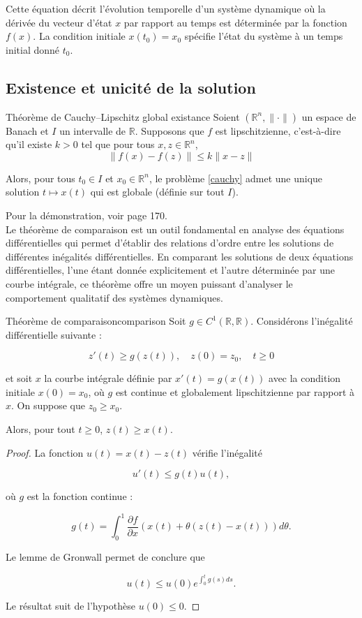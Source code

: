 \documentclass[12pt,a4paper]{report}%
\begin{document}
Cette équation décrit l'évolution temporelle d'un système dynamique où la dérivée du vecteur d'état \( x \) par rapport au temps est déterminée par la fonction \( f(x) \). La condition initiale \( x(t_0) = x_0 \) spécifie l'état du système à un temps initial donné \( t_0 \).

\subsection{Existence et unicité de la solution}
\begin{théorème}{Théorème de Cauchy–Lipschitz global }{existance}
Soient \( (\mathbb{R}^n ,\| \cdot \|) \) un espace de Banach et \( I \) un intervalle de \( \mathbb{R} \). Supposons que \( f \) est lipschitzienne, c'est-à-dire qu'il existe \( k > 0 \) tel que pour tous \( x, z \in \mathbb{R}^n \),
\[ \| f(x) - f(z) \| \leq k \| x - z \| \]

Alors, pour tous \( t_0 \in I \) et \( x_0 \in \mathbb{R}^n \), le problème \eqref{cauchy} admet une unique solution \( t \mapsto x(t) \) qui est globale (définie sur tout \( I \)).
\end{théorème}
Pour la démonstration, voir \cite{F} page 170.\\

Le théorème de comparaison est un outil fondamental en analyse des équations différentielles qui permet d'établir des relations d'ordre entre les solutions de différentes inégalités différentielles. En comparant les solutions de deux équations différentielles, l'une étant donnée explicitement et l'autre déterminée par une courbe intégrale, ce théorème offre un moyen puissant d'analyser le comportement qualitatif des systèmes dynamiques.
\begin{théorème}{Théorème de comparaison}{comparison}
Soit \( g \in C^1(\mathbb{R}, \mathbb{R}) \). Considérons l'inégalité différentielle suivante :

\[ z'(t) \geq g(z(t)), \quad z(0) = z_0, \quad t \geq 0 \]

et soit \( x \) la courbe intégrale définie par \( x'(t) = g(x(t)) \) avec la condition initiale \( x(0) = x_0 \), où \( g \) est continue et globalement lipschitzienne par rapport à \( x \). On suppose que \( z_0 \geq x_0 \).

Alors, pour tout \( t \geq 0 \), \( z(t) \geq x(t) \).
\end{théorème}
\begin{proof}
	La fonction \( u(t) =   x(t) - z(t) \) vérifie l'inégalité
	
	\[ u'(t) \leq g(t) u(t), \]
	
	où \( g \) est la fonction continue :
	
	\[ g(t) = \int_0^1 \frac{\partial f}{\partial x} \left( x(t) + \theta (z(t) - x(t)) \right) d\theta. \]
	
	Le lemme de Gronwall permet de conclure que
	
	\[ u(t) \leq u(0) e^{\int_0^t g(s) ds}. \]
	
	Le résultat suit de l'hypothèse \( u(0) \leq 0 \).
\end{proof}
\end{document}
